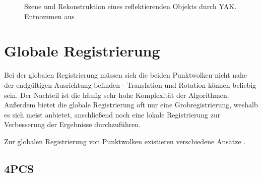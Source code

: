 \begin{figure}[ht]
	\centering
	\qquad
	\caption{Szene und Rekonstruktion eines reflektierenden Objekts durch \ac{YAK}. Entnommen aus \cite{schornak2019yak}}
	\label{fig:yak-reflecting-model}
\end{figure}


\section{Globale Registrierung}
\label{sec:global-registration}

Bei der globalen Registrierung müssen sich die beiden Punktwolken nicht nahe der endgültigen Ausrichtung befinden - Translation und Rotation können beliebig sein.
Der Nachteil ist die häufig sehr hohe Komplexität der Algorithmen.
Außerdem bietet die globale Registrierung oft nur eine Grobregistrierung, weshalb es sich meist anbietet, anschließend noch eine lokale Registrierung zur Verbesserung der Ergebnisse durchzuführen.

Zur globalen Registrierung von Punktwolken existieren verschiedene Ansätze \cite{chaudhury2015global, zhou2016fast, rusu2009fast}.


\subsection{\acl{4PCS}}
\label{subsec:4pcs}

